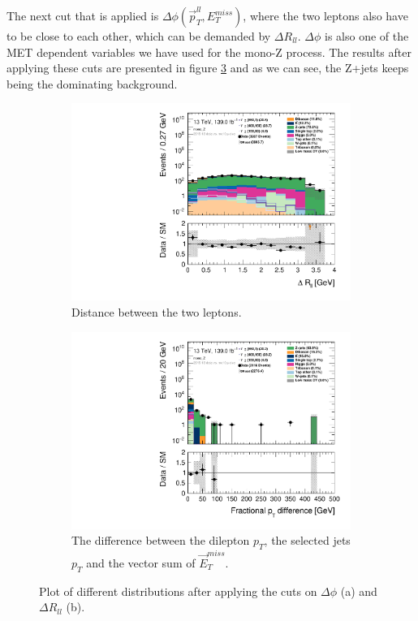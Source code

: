 The next cut that is applied is $\Delta \phi (\Vec{p}_T^{ll}, E_T^{miss})$, where the two leptons also have to be close to each other, which can be demanded by $\Delta R_{ll}$. $\Delta \phi$ is also one of the MET dependent variables we have used for the mono-Z process. The results after applying these cuts are presented in figure \ref{fig:stepsDM3} and as we can see, the Z+jets keeps being the dominating background. 




\begin{figure}[H]
    \centering
    \begin{subfigure}[t!]{0.49\textwidth}
        \includegraphics[width=\textwidth]{Figures/MonoZcuts/hist1d_deltaRll_mono_Z.pdf}
    \caption{Distance between the two leptons.}
    \label{fig:delRllDM}
    \end{subfigure}
    \begin{subfigure}[t!]{0.49\textwidth}
        \includegraphics[width=\textwidth]{Figures/MonoZcuts/hist1d_pTdiff_mono_Z.pdf}
    \caption{The difference between the dilepton $p_T$, the selected jets $p_T$ and the vector sum of $\Vec{E}_T^{miss}$.}
    \label{fig:pTdiffDM}
    \end{subfigure}
    \caption{Plot of different distributions after applying the cuts on $\Delta \phi$ (a) and $\Delta R_{ll}$ (b).}
    \label{fig:stepsDM3}
\end{figure}


